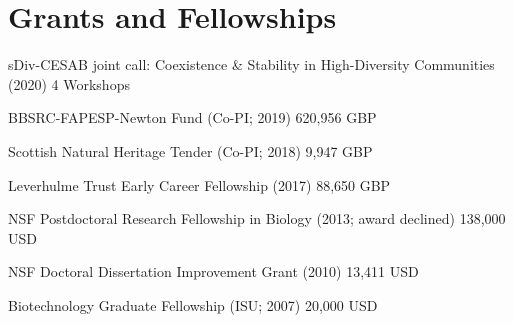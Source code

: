 \documentclass[letterpaper]{article}
\renewenvironment{itemize}{
  \begin{list}{}{
    \setlength{\leftmargin}{1.5em}
  }
}{
  \end{list}
}
\begin{document}
\section*{Grants and Fellowships}
\begin{itemize}
\item sDiv-CESAB joint call: Coexistence \& Stability in High-Diversity Communities (2020) \hfill 4 Workshops
\item BBSRC-FAPESP-Newton Fund (Co-PI; 2019) \hfill 620,956 GBP
\item Scottish Natural Heritage Tender (Co-PI; 2018) \hfill 9,947 GBP
\item Leverhulme Trust Early Career Fellowship (2017) \hfill 88,650 GBP
\item NSF Postdoctoral Research Fellowship in Biology (2013; award declined) \hfill 138,000 USD
\item NSF Doctoral Dissertation Improvement Grant (2010) \hfill 13,411 USD
\item Biotechnology Graduate Fellowship (ISU; 2007) \hfill 20,000 USD 
\end{itemize}
\end{document}
